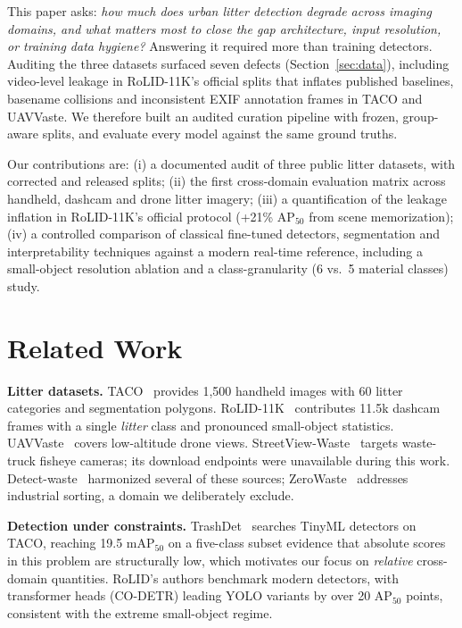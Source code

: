 \documentclass[conference]{IEEEtran}
\begin{document}
This paper asks: \emph{how much does urban litter detection degrade across
imaging domains, and what matters most to close the gap architecture, input
resolution, or training data hygiene?} Answering it required more than training
detectors. Auditing the three datasets surfaced seven defects (Section~\ref{sec:data}),
including video-level leakage in RoLID-11K's official splits that inflates
published baselines, basename collisions and inconsistent EXIF annotation frames
in TACO and UAVVaste. We therefore built an audited curation pipeline with frozen,
group-aware splits, and evaluate every model against the same ground truths.

Our contributions are:
(i) a documented audit of three public litter datasets, with corrected and
released splits;
(ii) the first cross-domain evaluation matrix across handheld, dashcam and drone
litter imagery;
(iii) a quantification of the leakage inflation in RoLID-11K's official protocol
(+21\% AP$_{50}$ from scene memorization);
(iv) a controlled comparison of classical fine-tuned detectors, segmentation and
interpretability techniques against a modern real-time reference, including a
small-object resolution ablation and a class-granularity (6 vs.\ 5 material
classes) study.

\section{Related Work}
\textbf{Litter datasets.} TACO~\cite{taco} provides 1{,}500 handheld images with
60 litter categories and segmentation polygons. RoLID-11K~\cite{rolid} contributes
11.5k dashcam frames with a single \emph{litter} class and pronounced small-object
statistics. UAVVaste~\cite{uavvaste} covers low-altitude drone views.
StreetView-Waste~\cite{streetview} targets waste-truck fisheye cameras; its
download endpoints were unavailable during this work.
Detect-waste~\cite{detectwaste} harmonized several of these sources; ZeroWaste~\cite{zerowaste}
addresses industrial sorting, a domain we deliberately exclude.

\textbf{Detection under constraints.} TrashDet~\cite{trashdet} searches TinyML
detectors on TACO, reaching 19.5 mAP$_{50}$ on a five-class subset evidence that
absolute scores in this problem are structurally low, which motivates our focus on
\emph{relative} cross-domain quantities. RoLID's authors benchmark modern
detectors, with transformer heads (CO-DETR) leading YOLO variants by over
20 AP$_{50}$ points, consistent with the extreme small-object regime.
\end{document}
